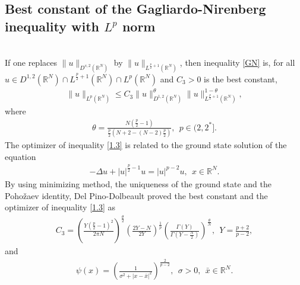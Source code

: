 \documentclass[12pt,a4paper,reqno]{amsart}
\numberwithin{equation}{section}
\begin{document}
\subsection{Best constant of the Gagliardo-Nirenberg inequality with $L^{p}$ norm}

$~$\\
If one replaces $\|u\|_{D^{s,2}(\mathbb{R}^{N})}$ by $\|u\|_{L^{\frac{p}{2}+1}(\mathbb{R}^{N})}$, then inequality \eqref{GN} is, for all $u\in D^{1,2}(\mathbb{R}^{N})\cap L^{\frac{p}{2}+1}(\mathbb{R}^{N})\cap L^{p}(\mathbb{R}^{N})$ and $C_{3}>0$ is the best constant,
\begin{equation}\label{1.3}
\begin{aligned}
\|u\|_{L^{p}(\mathbb{R}^{N})}
\leqslant
C_{3}
\|u\|_{D^{1,2}(\mathbb{R}^{N})}^{\theta}
\|u\|_{L^{\frac{p}{2}+1}(\mathbb{R}^{N})}^{1-\theta},
\end{aligned}
\end{equation}
where
\begin{equation*}
\begin{aligned}
\theta=\frac{N(\frac{p}{2}-1)}{\frac{p}{2}(N+2-(N-2)\frac{p}{2})},~~p\in(2,2^{*}].
\end{aligned}
\end{equation*}
The optimizer of inequality \eqref{1.3} is related to the ground state solution of the equation
\begin{equation*}
\begin{aligned}
-\Delta u+|u|^{\frac{p}{2}-1}u
=|u|^{p-2}u, \ \ x\in\mathbb{R}^{N}.
\end{aligned}
\end{equation*}
By using minimizing method, the uniqueness of the ground state and the Poho\v{z}aev identity,
Del Pino-Dolbeault
\cite[Theorem 1]{DelPino-Dolbeault2002JMPA} proved the best constant and the optimizer of inequality \eqref{1.3} as
\begin{equation*}
\begin{aligned}
C_{3}
=
\left(
\frac{Y(\frac{p}{2}-1)^{2}}{2\pi N}
\right)^{\frac{\theta}{2}}
\left(
\frac{2Y-N}{2Y}
\right)^{\frac{1}{p}}
\left(
\frac{\Gamma(Y)}{\Gamma(Y-\frac{N}{2})}
\right)^{\frac{\theta}{N}},
~~
Y=\frac{p+2}{p-2},
\end{aligned}
\end{equation*}
and
\begin{equation*}
\begin{aligned}
\psi(x)=\left(\frac{1}{\sigma^{2}+|x-\bar{x}|^{2}}\right)^{\frac{2}{p-2}},~~\sigma>0,~~\bar{x}\in \mathbb{R}^{N}.
\end{aligned}
\end{equation*}
\end{document}
